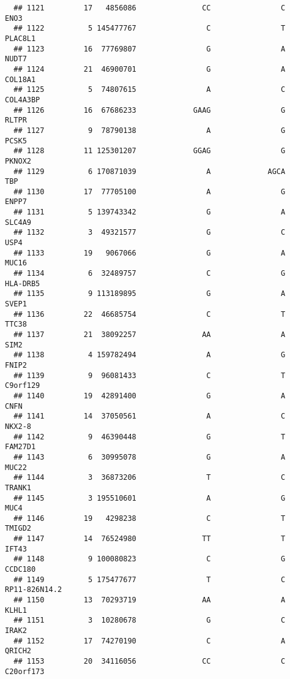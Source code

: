\documentclass[12pt,twoside]{reedthesis}
\theoremstyle{definition}
\theoremstyle{definition}
\theoremstyle{remark}
\begin{document}
\begin{verbatim}
  ## 1121         17   4856086               CC                C           ENO3
  ## 1122          5 145477767                C                T        PLAC8L1
  ## 1123         16  77769807                G                A          NUDT7
  ## 1124         21  46900701                G                A        COL18A1
  ## 1125          5  74807615                A                C       COL4A3BP
  ## 1126         16  67686233             GAAG                G          RLTPR
  ## 1127          9  78790138                A                G          PCSK5
  ## 1128         11 125301207             GGAG                G         PKNOX2
  ## 1129          6 170871039                A             AGCA            TBP
  ## 1130         17  77705100                A                G          ENPP7
  ## 1131          5 139743342                G                A         SLC4A9
  ## 1132          3  49321577                G                C           USP4
  ## 1133         19   9067066                G                A          MUC16
  ## 1134          6  32489757                C                G       HLA-DRB5
  ## 1135          9 113189895                G                A          SVEP1
  ## 1136         22  46685754                C                T          TTC38
  ## 1137         21  38092257               AA                A           SIM2
  ## 1138          4 159782494                A                G          FNIP2
  ## 1139          9  96081433                C                T       C9orf129
  ## 1140         19  42891400                G                A           CNFN
  ## 1141         14  37050561                A                C         NKX2-8
  ## 1142          9  46390448                G                T        FAM27D1
  ## 1143          6  30995078                G                A          MUC22
  ## 1144          3  36873206                T                C         TRANK1
  ## 1145          3 195510601                A                G           MUC4
  ## 1146         19   4298238                C                T         TMIGD2
  ## 1147         14  76524980               TT                T          IFT43
  ## 1148          9 100080823                C                G        CCDC180
  ## 1149          5 175477677                T                C  RP11-826N14.2
  ## 1150         13  70293719               AA                A          KLHL1
  ## 1151          3  10280678                G                C          IRAK2
  ## 1152         17  74270190                C                A         QRICH2
  ## 1153         20  34116056               CC                C      C20orf173

\end{verbatim}
\end{document}
